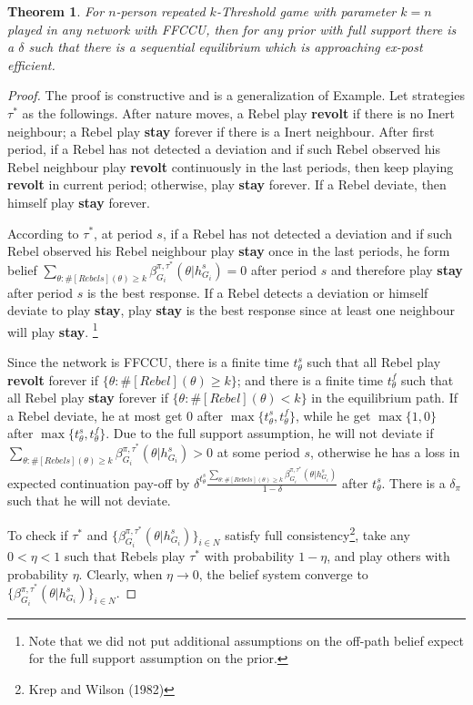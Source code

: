 \documentclass[12pt,letter]{article}
\newtheorem{theorem}{Theorem}
\theoremstyle{definition}
\theoremstyle{remark}
\theoremstyle{claim}
\begin{document}
\begin{theorem}
\label{prop:not_crowded}
For $n$-person repeated $k$-Threshold game with parameter $k=n$ played in any network with FFCCU, then for any prior with full support there is a $\delta$ such that there is a sequential equilibrium which is approaching ex-post efficient.
\end{theorem}
\begin{proof}
The proof is constructive and is a generalization of Example. Let strategies $\tau^{*}$ as the followings. After nature moves, a Rebel play \textbf{revolt}  if there is no Inert neighbour; a Rebel play \textbf{stay} forever if there is a Inert neighbour. After first period, if a Rebel has not detected a deviation and if such Rebel observed his Rebel neighbour play \textbf{revolt} continuously in the last periods, then keep playing \textbf{revolt} in current period; otherwise, play \textbf{stay} forever. If a Rebel deviate, then himself play \textbf{stay} forever.

According to $\tau^{*}$, at period $s$, if a Rebel has not detected a deviation and if such Rebel observed his Rebel neighbour play \textbf{stay} once in the last periods, he form belief $\sum_{\theta:\#[Rebels](\theta)\geq k}\beta^{\pi,\tau^*}_{G_i}(\theta|h^{s}_{G_i})=0$ after period $s$ and therefore play \textbf{stay} after period $s$ is the best response. If a Rebel detects a deviation or himself deviate to play \textbf{stay}, play \textbf{stay} is the best response since at least one neighbour will play \textbf{stay}. \footnote{Note that we did not put additional assumptions on the off-path belief expect for the full support assumption on the prior.}

Since the network is FFCCU, there is a finite time $t^{s}_{\theta}$ such that all Rebel play \textbf{revolt} forever if $\{\theta: \#[Rebel](\theta)\geq k\}$; and there is a finite time $t^f_{\theta}$ such that all Rebel play \textbf{stay} forever if $\{\theta: \#[Rebel](\theta)< k\}$ in the equilibrium path. If a Rebel deviate, he at most get 0 after $\max\{t^{s}_{\theta},t^f_{\theta}\}$, while he get $\max\{1,0\}$ after $\max\{t^{s}_{\theta},t^f_{\theta}\}$. Due to the full support assumption, he will not deviate if $\sum_{\theta:\#[Rebels](\theta)\geq k}\beta^{\pi,\tau^*}_{G_i}(\theta|h^{s}_{G_i})>0$ at some period $s$, otherwise he has a loss in expected continuation pay-off by $\delta^{t^s_{\theta}}\frac{\sum_{\theta:\#[Rebels](\theta)\geq k}\beta^{\pi,\tau^*}_{G_i}(\theta|h^{s}_{G_i})}{1-\delta}$ after $t^s_{\theta}$. There is a $\delta_{\pi}$ such that he will not deviate.

To check if $\tau^{*}$ and $\{\beta^{\pi,\tau^*}_{G_i}(\theta|h^{s}_{G_i})\}_{i\in N}$ satisfy full consistency\footnote{Krep and Wilson (1982)}, take any $0<\eta<1$ such that Rebels play $\tau^{*}$ with probability $1-\eta$, and play others with probability $\eta$. Clearly, when $\eta \rightarrow 0$, the belief system converge to $\{\beta^{\pi,\tau^*}_{G_i}(\theta|h^{s}_{G_i})\}_{i\in N}$.
\end{proof}
\end{document}
